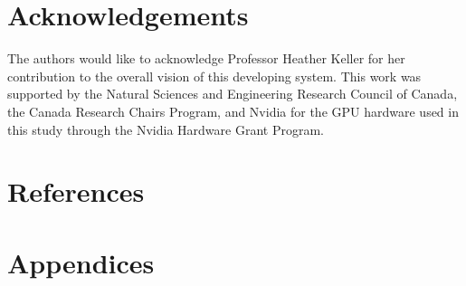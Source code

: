 \documentclass[authoryear]{elsarticle}
\begin{document}
\section*{Acknowledgements}
The authors would like to acknowledge Professor Heather Keller for her contribution to the overall vision of this developing system. This work was supported by the Natural Sciences and Engineering Research Council of Canada, the Canada Research Chairs Program, and Nvidia for the GPU hardware used in this study through the Nvidia Hardware Grant Program.

\section*{References}


\newpage
\section*{Appendices}
\setcounter{equation}{0}%
\renewcommand{\theequation}{A.\arabic{equation}}
\renewcommand{\thetable}{A.\arabic{atable}}
\renewcommand{\thefigure}{A.\arabic{afigure}}
\end{document}

